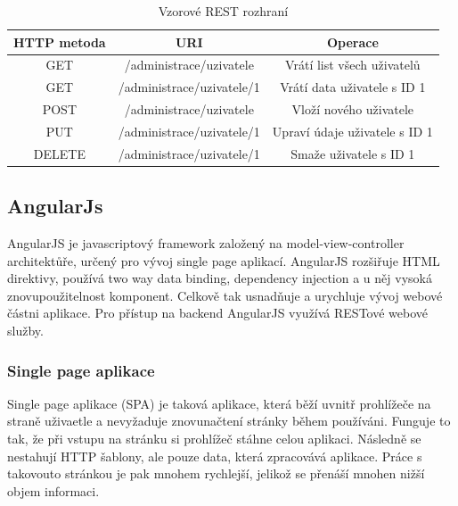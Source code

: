 \documentclass[czech,master,public,dept460,male,cpdeclaration,twoside]{diploma}
\begin{document}
\begin{table}[H]
	\centering
	\caption{Vzorové REST rozhraní}
	\label{tab:REST}
	\begin{tabular}{|c|c|c|}
		\hline
		{\bf HTTP metoda} & {\bf URI} & {\bf Operace} \\
		\hline
		GET & /administrace/uzivatele & Vrátí list všech uživatelů \\
		\hline
		GET & /administrace/uzivatele/1 & Vrátí data uživatele s ID 1 \\
		\hline
		POST & /administrace/uzivatele & Vloží nového uživatele \\
		\hline
		PUT & /administrace/uzivatele/1 & Upraví údaje uživatele s ID 1 \\
		\hline
		DELETE & /administrace/uzivatele/1 & Smaže uživatele s ID 1 \\
		\hline
	\end{tabular}
\end{table}
	
\subsection{AngularJs}
AngularJS je javascriptový framework založený na model-view-controller architektůře, určený pro vývoj single page aplikací. AngularJS rozšiřuje HTML direktivy, používá two way data binding, dependency injection a u něj vysoká znovupoužitelnost komponent. Celkově tak usnadňuje a urychluje vývoj webové částni aplikace. Pro přístup na backend AngularJS využívá RESTové webové služby. \cite{coJeAngular}

\subsubsection{Single page aplikace}
Single page aplikace (SPA) je taková aplikace, která běží uvnitř prohlížeče na straně uživaetle a nevyžaduje znovunačtení stránky během používáni. Funguje to tak, že při vstupu na stránku si prohlížeč stáhne celou aplikaci. Následně se nestahují HTTP šablony, ale pouze data, která zpracovává aplikace. Práce s takovouto stránkou je pak mnohem rychlejší, jelikož se přenáší mnohen nižší objem informaci. \cite{SPA}
\end{document}

